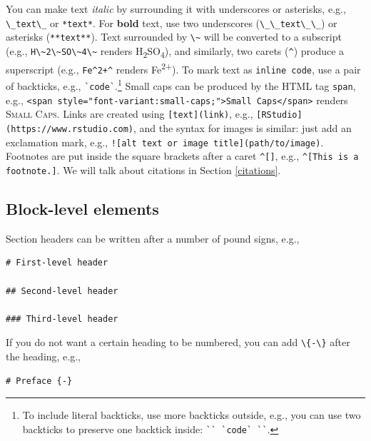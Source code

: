 \documentclass[doctor,openright,twoside]{sjtuthesis}
\newcommand{\passthrough}[1]{#1}
\theoremstyle{plain}
\theoremstyle{definition}
\theoremstyle{remark}
\theoremstyle{ocrenumbox}
\theoremstyle{plain}
\begin{document}
You can make text \emph{italic} by surrounding it with underscores or asterisks, e.g., \passthrough{\lstinline!\_text\_!} or \passthrough{\lstinline!*text*!}. For \textbf{bold} text, use two underscores (\passthrough{\lstinline!\_\_text\_\_!}) or asterisks (\passthrough{\lstinline!**text**!}). Text surrounded by \passthrough{\lstinline!\~!} will be converted to a subscript (e.g., \passthrough{\lstinline!H\~2\~SO\~4\~!} renders H\textsubscript{2}SO\textsubscript{4}), and similarly, two carets (\passthrough{\lstinline!^!}) produce a superscript (e.g., \passthrough{\lstinline!Fe^2+^!} renders Fe\textsuperscript{2+}). To mark text as \passthrough{\lstinline!inline code!}, use a pair of backticks, e.g., \passthrough{\lstinline!`code`!}.\footnote{To include literal backticks, use more backticks outside, e.g., you can use two backticks to preserve one backtick inside: \passthrough{\lstinline!`` `code` ``!}.} Small caps can be produced by the HTML tag \passthrough{\lstinline!span!}, e.g., \passthrough{\lstinline!<span style="font-variant:small-caps;">Small Caps</span>!} renders \textsc{Small Caps}. Links are created using \passthrough{\lstinline![text](link)!}, e.g., \passthrough{\lstinline![RStudio](https://www.rstudio.com)!}, and the syntax for images is similar: just add an exclamation mark, e.g., \passthrough{\lstinline"![alt text or image title](path/to/image)"}. Footnotes are put inside the square brackets after a caret \passthrough{\lstinline!^[]!}, e.g., \passthrough{\lstinline!^[This is a footnote.]!}. We will talk about citations in Section \ref{citations}.

\hypertarget{block-level-elements}{%
\subsection{Block-level elements}\label{block-level-elements}}

Section headers can be written after a number of pound signs, e.g.,

\begin{lstlisting}
# First-level header

## Second-level header

### Third-level header
\end{lstlisting}

If you do not want a certain heading to be numbered, you can add \passthrough{\lstinline!\{-\}!} after the heading, e.g.,

\begin{lstlisting}
# Preface {-}
\end{lstlisting}
\end{document}
